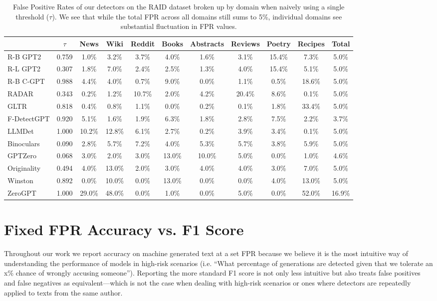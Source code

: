 \documentclass[11pt]{article}
\begin{document}
\begin{table}[t]
    \small
    \centering
    \begin{tabular}{l|c|c|c|c|c|c|c|c|c|c}
    \toprule 
    &$\tau$&\textbf{News}&\textbf{Wiki}&\textbf{Reddit}&\textbf{Books}&\textbf{Abstracts}&\textbf{Reviews}&\textbf{Poetry}&\textbf{Recipes}&\textbf{Total}\\
    \midrule
    R-B GPT2&0.759&1.0\%&3.2\%&3.7\%&4.0\%&1.6\%&3.1\%&15.4\%&7.3\%&5.0\%\\
    R-L GPT2&0.307&1.8\%&7.0\%&2.4\%&2.5\%&1.3\%&4.0\%&15.4\%&5.1\%&5.0\%\\
    R-B C-GPT&0.988&4.4\%&4.0\%&0.7\%&9.0\%&0.0\%&1.1\%&0.5\%&18.6\%&5.0\%\\
    RADAR&0.343&0.2\%&1.2\%&10.7\%&2.0\%&4.2\%&20.4\%&8.6\%&0.1\%&5.0\%\\
    \midrule
    GLTR&0.818&0.4\%&0.8\%&1.1\%&0.0\%&0.2\%&0.1\%&1.8\%&33.4\%&5.0\%\\
    F-DetectGPT&0.920&5.1\%&1.6\%&1.9\%&6.3\%&1.8\%&2.8\%&7.5\%&2.2\%&3.7\%\\
    LLMDet&1.000&10.2\%&12.8\%&6.1\%&2.7\%&0.2\%&3.9\%&3.4\%&0.1\%&5.0\%\\
    Binoculars&0.090&2.8\%&5.7\%&7.2\%&4.0\%&5.3\%&5.7\%&3.8\%&5.9\%&5.0\%\\
    \midrule
    GPTZero&0.068&3.0\%&2.0\%&3.0\%&13.0\%&10.0\%&5.0\%&0.0\%&1.0\%&4.6\%\\
    Originality&0.494&4.0\%&13.0\%&2.0\%&3.0\%&4.0\%&4.0\%&3.0\%&7.0\%&5.0\%\\
    Winston&0.892&0.0\%&10.0\%&0.0\%&13.0\%&0.0\%&0.0\%&4.0\%&13.0\%&5.0\%\\
    ZeroGPT&1.000&29.0\%&48.0\%&0.0\%&1.0\%&0.0\%&5.0\%&0.0\%&52.0\%&16.9\%\\
    \bottomrule
    \end{tabular}
    \caption{False Positive Rates of our detectors on the RAID dataset broken up by domain when naively using a single threshold ($\tau$). We see that while the total FPR across all domains still sums to 5\%, individual domains see substantial fluctuation in FPR values.}
    \label{tab:naive_thresholds_fpr}
\end{table}

\section{Fixed FPR Accuracy vs. F1 Score}
\label{app:accuracy_vs_f1}
Throughout our work we report accuracy on machine generated text at a set FPR because we believe it is the most intuitive way of understanding the performance of models in high-risk scenarios (i.e. “What percentage of generations are detected given that we tolerate an x\% chance of wrongly accusing someone”). Reporting the more standard F1 score is not only less intuitive but also treats false positives and false negatives as equivalent---which is not the case when dealing with high-risk scenarios or ones where detectors are repeatedly applied to texts from the same author.
\end{document}

